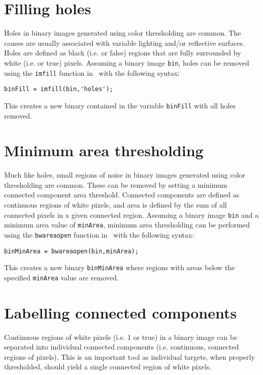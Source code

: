 \documentclass{tufte-handout}
\begin{document}
\section{Filling holes}
Holes in binary images generated using color thresholding are common. The causes are usually associated with variable lighting and/or reflective surfaces. Holes are defined as black (i.e.  or false) regions that are fully surrounded by white (i.e.  or true) pixels. Assuming a binary image \lstinline{bin}, holes can be removed using the \lstinline{imfill} function in \Matlab\ with the following syntax:
\begin{lstlisting}[style=usnaMatlab]
binFill = imfill(bin,'holes');
\end{lstlisting}
This creates a new binary contained in the variable \lstinline{binFill} with all holes removed.

\section{Minimum area thresholding}
Much like holes, small regions of noise in binary images generated using color thresholding are common. These can be removed by setting a minimum connected component area threshold. Connected components are defined as continuous regions of white pixels, and area is defined by the sum of all connected pixels in a given connected region. Assuming a binary image \lstinline{bin} and a minimum area value of \lstinline{minArea}, minimum area thresholding can be performed using the \lstinline{bwareaopen} function in \Matlab\ with the following syntax:
\begin{lstlisting}[style=usnaMatlab]
binMinArea = bwareaopen(bin,minArea);
\end{lstlisting}
This creates a new binary \lstinline{binMinArea} where regions with areas below the specified \lstinline{minArea} value are removed.

\section{Labelling connected components}
Continuous regions of white pixels (i.e. 1 or true) in a binary image can be separated into individual connected components (i.e. continuous, connected regions of pixels). This is an important tool as individual targets, when properly thresholded, should yield a single connected region of white pixels. 
\end{document}
